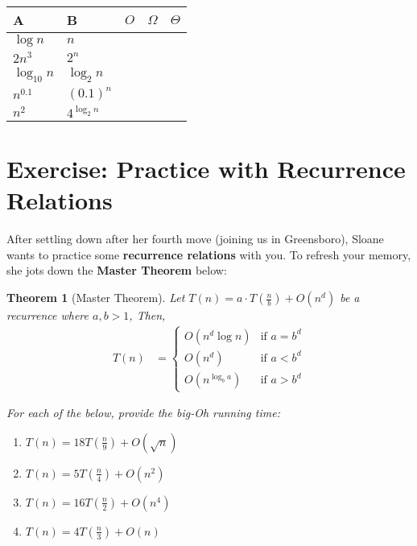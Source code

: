 \documentclass [12pt]{article}
\newtheorem{theorem}{Theorem}
\begin{document}
\begin{table}[h!]
\centering
\begin{tabular}{|l|l|l|l|l|}
\hline
\textbf{A} & \textbf{B} & $O$ & $\Omega$ & $\Theta$ \\ \hline
    $\log n$       &      $n$      &  &  &  \\ \hline
     $2n^3$      &  $2^n$         &  &  &  \\ \hline
       $\log_{10} n$    &  $\log_2 n$          &  &  &  \\ \hline
    $n^{0.1}$    &  $(0.1)^n$          &  &  &  \\ \hline
    $n^2$    &  $4^{\log_2 n}$          &  &  &  \\ \hline
\end{tabular}
\end{table}


\pagebreak
\section{Exercise: Practice with Recurrence Relations}
 After settling down after her fourth move (joining us in Greensboro), Sloane wants to practice some \textbf{recurrence relations} with you. To refresh your memory, she jots down the \textbf{Master Theorem} below:

\begin{theorem}[Master Theorem]
Let $T(n) = a \cdot T\left(\frac{n}{b}\right) + O(n^d)$ be a recurrence where $a, b > 1$, Then,
\begin{align*}
T(n) &= \begin{cases}
    O(n^d \log n) & \text{if } a = b^d \\
    O(n^d) & \text{if } a < b^d \\
    O(n^{\log_b a}) & \text{if } a > b^d
\end{cases}
\end{align*}


For each of the below, provide the big-Oh running time:
\begin{enumerate}[label=(\alph*)]
    \item {} $T(n) = 18T\left(\frac{n}{9} \right) + O(\sqrt{n})$
    \item {} $T(n) = 5T\left(\frac{n}{4} \right) + O(n^2)$
    \item {} $T(n) = 16T\left(\frac{n}{2} \right) + O(n^4)$
    \item {} $T(n) = 4T\left(\frac{n}{3} \right) + O(n)$
\end{enumerate}
\end{theorem}
\end{document}
